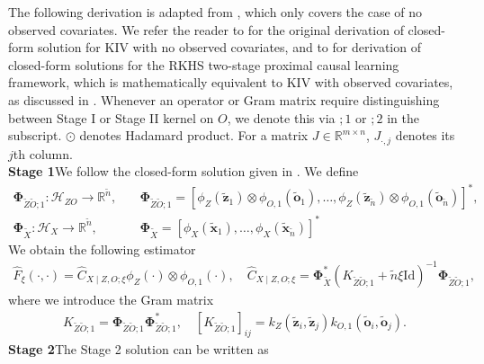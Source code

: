 \documentclass[11pt]{article}
\newcommand{\bx}{\mathbf x}
\newcommand{\bz}{\mathbf z}
\newcommand{\bo}{\mathbf o}
\newcommand{\0}{\mathbf{0}}
\newcommand{\bPhi}{\boldsymbol{\Phi}}
\begin{document}
\begin{appendix}
The following derivation is adapted from \citet[Section D]{meunier2024nonparametricinstrumentalregressionkernel}, which only covers the case of no observed covariates. We refer the reader to \citet[Section A.5.1]{singh2019kernel} for the original derivation of closed-form solution for KIV with no observed covariates, and to \citet{mastouri2021proximal, singh2023kernel, xu2025kernelsingleproxycontrol} for derivation of closed-form solutions for the RKHS two-stage proximal causal learning framework, which is mathematically equivalent to KIV with observed covariates, as discussed in . Whenever an operator or Gram matrix require distinguishing between Stage I or Stage II kernel on $O$, we denote this via $;1$ or $;2$ in the subscript. $\odot$  denotes Hadamard product. For a matrix $J\in \mathbb{R}^{m\times n}$, $J_{\cdot, j}$ denotes its $j$th column. \\
\textbf{Stage 1}\quad We follow the closed-form solution given in \citet{lietal2022optimal}.  We define
\begin{align*}
    \boldsymbol{\Phi}_{\tilde{Z}\tilde{O}; 1}: \mathcal{H}_{ZO} \rightarrow \mathbb{R}^{\tilde{n}},& \quad  \boldsymbol{\Phi}_{\tilde{Z}\tilde{O};1} = \left[\phi_Z\left(\tilde{\bz}_1\right) \otimes \phi_{O,1}\left(\tilde{\bo}_1\right), \ldots, \phi_Z\left(\tilde{\bz}_{\tilde{n}} \right) \otimes \phi_{O,1}(\tilde{\bo}_{\tilde{n}})\right]^*, \\
    \boldsymbol{\Phi}_{\tilde{X}}: \mathcal{H}_X \rightarrow \mathbb{R}^{\tilde{n}},& \quad \boldsymbol{\Phi}_{\tilde{X}}=\left[\phi_X\left(\tilde{\bx}_1\right), \ldots, \phi_X\left(\tilde{\bx}_{\tilde{n}} \right)\right]^* 
\end{align*}
We obtain the following estimator
\begin{align}
\label{eq:closed_form_stage_1_estimator}
    \hat{F}_{\xi}(\cdot, \cdot) = \hat{C}_{X\mid Z,O; \xi} \phi_{Z}(\cdot)\otimes \phi_{O,1}(\cdot),\quad 
    \hat{C}_{X\mid Z,O; \xi} = \bPhi_{\tilde{X}}^{\ast}\left(K_{\tilde{Z}\tilde{O};1} + \tilde{n}\xi\mathrm{Id}\right)^{-1}\bPhi_{\tilde{Z}\tilde{O}; 1},
\end{align}
where we introduce the Gram matrix
\begin{align*}
    K_{\tilde{Z}\tilde{O};1} = \bPhi_{\tilde{Z}\tilde{O};1}\bPhi_{\tilde{Z}\tilde{O};1}^{\ast}, \quad [K_{\tilde{Z}\tilde{O};1}]_{ij} = k_{Z}(\tilde{\bz}_i, \tilde{\bz}_j)k_{O,1}(\tilde{\bo}_i, \tilde{\bo}_j). 
\end{align*}
\textbf{Stage 2}\quad The Stage 2 solution can be written as 
\begin{align*}

\end{align*}
\end{appendix}
\end{document}
